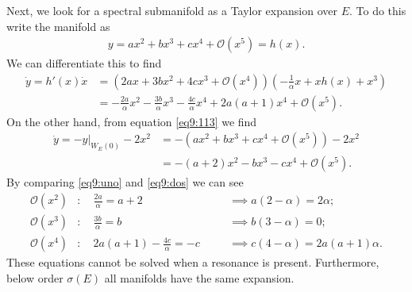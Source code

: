 \begin{ex}[]
	Next, we look for a spectral submanifold as a Taylor expansion over $E$. To do this write the manifold as
	\begin{align}
		y = ax^2 + bx^3 + cx^4 + \mathcal{O}(x^5) = h(x).
	\end{align}
	We can differentiate this to find
	\begin{align} 
		\dot{y} = h'(x)\dot{x} &= \left(2ax + 3bx^2 + 4cx^3 + \mathcal{O}(x^4)\right) \left( - \frac{1}{\alpha } x + xh(x) + x^3 \right) \\
				       &= -\frac{2a}{\alpha } x^2 - \frac{3b}{\alpha }x^3 - \frac{4c}{\alpha }x^4 + 2a(a+1) x^4 + \mathcal{O}(x^5). \label{eq9:uno} 
       \end{align}
       On the other hand, from equation \eqref{eq9:113} we find
       \begin{align}
		\dot{y} =\left. -y \right|_{W_E(0)} - 2x^2 &= -\left(ax^2 + bx^3 + cx^4 + \mathcal{O}(x^5)\right) - 2x^2\\
							   &= -(a+2)x^2 - bx^3 - cx^4 + \mathcal{O}(x^5). \label{eq9:dos}
	\end{align}
	By comparing \eqref{eq9:uno} and \eqref{eq9:dos} we can see
	\begin{align}
		\mathcal{O}(x^2)&:\quad \frac{2a}{\alpha } = a+2 \quad &&\implies a(2-\alpha ) = 2\alpha; \\ 
		\mathcal{O}(x^3)&:\quad \frac{3b}{\alpha } = b \quad &&\implies b(3-\alpha ) = 0;\\
		\mathcal{O}(x^4)&:\quad 2a(a+1)- \frac{4c}{\alpha }= -c \quad &&\implies c(4-\alpha )= 2a(a+1)\alpha .
	\end{align}
	These equations cannot be solved when a resonance is present. Furthermore, below order $\sigma(E)$ all manifolds have the same expansion.


\end{ex}
